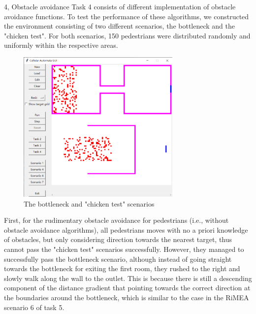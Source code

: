 \documentclass[10pt,a4paper]{article}
\begin{document}
\begin{task}{4, Obstacle avoidance}
Task 4 consists of different implementation of obstacle avoidance functions. To test the performance of these algorithms, we constructed the environment consisting of two different scenarios, the bottleneck and the "chicken test". For both scenarios, 150 pedestrians were distributed randomly and uniformly within the respective areas. 

\begin{figure}[h]
    \includegraphics[width=8cm]{task4_1}
    \centering
    \caption{The bottleneck and "chicken test" scenarios}
    \label{fig4_1}
\end{figure}

First, for the rudimentary obstacle avoidance for pedestrians (i.e., without obstacle avoidance algorithms), all pedestrians moves with no a priori knowledge of obstacles, but only considering direction towards the nearest target, thus cannot pass the "chicken test" scenarios successfully. However, they managed to successfully pass the bottleneck scenario, although instead of going straight towards the bottleneck for exiting the first room, they rushed to the right and slowly walk along the wall to the outlet. This is because there is still a descending component of the distance gradient that pointing towards the correct direction at the boundaries around the bottleneck, which is similar to the case in the RiMEA scenario 6 of task 5.


\end{task}
\end{document}
